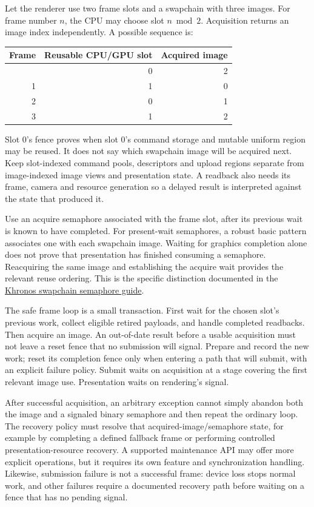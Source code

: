 Let the renderer use two frame slots and a swapchain with three images. For frame number \(n\), the CPU may choose slot \(n\bmod2\). Acquisition returns an image index independently. A possible sequence is:

{\def\LTcaptype{none} %
\begin{longtable}[]{@{}rrr@{}}
\toprule\noalign{}
Frame & Reusable CPU/GPU slot & Acquired image \\
\midrule\noalign{}
\endhead
\bottomrule\noalign{}
\endlastfoot
0 & 0 & 2 \\
1 & 1 & 0 \\
2 & 0 & 1 \\
3 & 1 & 2 \\
\end{longtable}
}

Slot 0's fence proves when slot 0's command storage and mutable uniform region may be reused. It does not say which swapchain image will be acquired next. Keep slot-indexed command pools, descriptors and upload regions separate from image-indexed image views and presentation state. A readback also needs its frame, camera and resource generation so a delayed result is interpreted against the state that produced it.

Use an acquire semaphore associated with the frame slot, after its previous wait is known to have completed. For present-wait semaphores, a robust basic pattern associates one with each swapchain image. Waiting for graphics completion alone does not prove that presentation has finished consuming a semaphore. Reacquiring the same image and establishing the acquire wait provides the relevant reuse ordering. This is the specific distinction documented in the \href{https://docs.vulkan.org/guide/latest/swapchain_semaphore_reuse.html}{Khronos swapchain semaphore guide}.

The safe frame loop is a small transaction. First wait for the chosen slot's previous work, collect eligible retired payloads, and handle completed readbacks. Then acquire an image. An out-of-date result before a usable acquisition must not leave a reset fence that no submission will signal. Prepare and record the new work; reset its completion fence only when entering a path that will submit, with an explicit failure policy. Submit waits on acquisition at a stage covering the first relevant image use. Presentation waits on rendering's signal.

After successful acquisition, an arbitrary exception cannot simply abandon both the image and a signaled binary semaphore and then repeat the ordinary loop. The recovery policy must resolve that acquired-image/semaphore state, for example by completing a defined fallback frame or performing controlled presentation-resource recovery. A supported maintenance API may offer more explicit operations, but it requires its own feature and synchronization handling. Likewise, submission failure is not a successful frame: device loss stops normal work, and other failures require a documented recovery path before waiting on a fence that has no pending signal.

